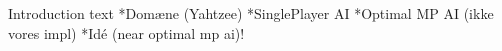 Introduction text
 *Domæne (Yahtzee)
 *SinglePlayer AI
 *Optimal MP AI (ikke vores impl)
 *Idé (near optimal mp ai)!
